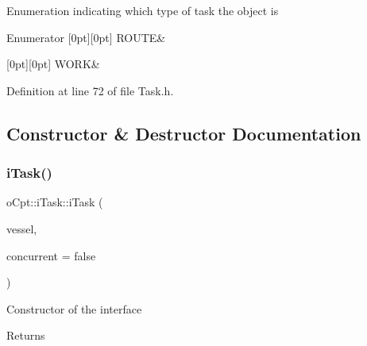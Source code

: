Enumeration indicating which type of task the object is \begin{DoxyEnumFields}{Enumerator}
[0pt][0pt]{}\hypertarget{classo_cpt_1_1i_task_a10d8726eb8957c2c305f468cf15b9f11a7ca85240095e3a76c70f5535d26c4dd3}{}\label{classo_cpt_1_1i_task_a10d8726eb8957c2c305f468cf15b9f11a7ca85240095e3a76c70f5535d26c4dd3} 
R\+O\+U\+TE&\\
\hline

[0pt][0pt]{}\hypertarget{classo_cpt_1_1i_task_a10d8726eb8957c2c305f468cf15b9f11a1ec34e80717bb96ddd8376ff12d1b4c9}{}\label{classo_cpt_1_1i_task_a10d8726eb8957c2c305f468cf15b9f11a1ec34e80717bb96ddd8376ff12d1b4c9} 
W\+O\+RK&\\
\hline

\end{DoxyEnumFields}


Definition at line 72 of file Task.\+h.



\subsection{Constructor \& Destructor Documentation}
\hypertarget{classo_cpt_1_1i_task_a5b5affdc2f5213d8c5f11e8cd1cda517}{}\label{classo_cpt_1_1i_task_a5b5affdc2f5213d8c5f11e8cd1cda517} 
\subsubsection{\texorpdfstring{i\+Task()}{iTask()}}
{\footnotesize\ttfamily o\+Cpt\+::i\+Task\+::i\+Task (\begin{DoxyParamCaption}\item[{\hyperlink{classo_cpt_1_1i_vessel_a43711a596f3bdfd0ca732ed3901edc97}{i\+Vessel\+::ptr}}]{vessel,  }\item[{bool}]{concurrent = {\ttfamily false} }\end{DoxyParamCaption})}

Constructor of the interface \begin{DoxyReturn}{Returns}

\end{DoxyReturn}


